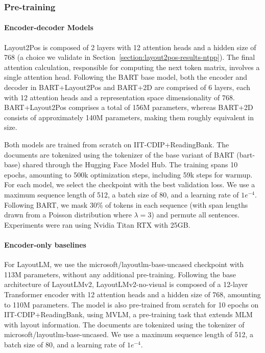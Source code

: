 \subsubsection{Pre-training}

\paragraph{Encoder-decoder Models} Layout2Pos is composed of 2 layers with 12 attention heads and a hidden size of 768 (a choice we validate in Section~\ref{section:layout2pos-results-ntpp}). The final attention calculation, responsible for computing the next token matrix, involves a single attention head. Following the \ac{BART} base model, both the encoder and decoder in BART+Layout2Pos and BART+2D are comprised of 6 layers, each with 12 attention heads and a representation space dimensionality of 768. BART+Layout2Pos comprises a total of 156M parameters, whereas BART+2D consists of approximately 140M parameters, making them roughly equivalent in size.

Both models are trained from scratch on IIT-CDIP+ReadingBank. The documents are tokenized using the tokenizer of the base variant of \ac{BART} (bart-base) shared through the Hugging Face Model Hub. The training spans 10 epochs, amounting to 500k optimization steps, including 59k steps for warmup. For each model, we select the checkpoint with the best validation loss. We use a maximum sequence length of 512, a batch size of 80, and a learning rate of $1e^{-4}$. Following \ac{BART}, we mask 30\% of tokens in each sequence (with span lengths drawn from a Poisson distribution where $\lambda = 3$) and permute all sentences. Experiments were ran using Nvidia Titan RTX with 25GB. 

\paragraph{Encoder-only baselines} For LayoutLM, we use the microsoft/layoutlm-base-uncased checkpoint with 113M parameters, without any additional pre-training. Following the base architecture of LayoutLMv2, LayoutLMv2-no-visual is composed of a 12-layer Transformer encoder with 12 attention heads and a hidden size of 768, amounting to 110M parameters. The model is also pre-trained from scratch for 10 epochs on IIT-CDIP+ReadingBank, using \ac{MVLM}, a pre-training task that extends \ac{MLM} with layout information. The documents are tokenized using the tokenizer of microsoft/layoutlm-base-uncased. We use a maximum sequence length of 512, a batch size of 80, and a learning rate of $1e^{-4}$.


